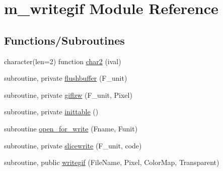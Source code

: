 \hypertarget{namespacem__writegif}{}\section{m\+\_\+writegif Module Reference}
\label{namespacem__writegif}
\subsection*{Functions/\+Subroutines}
\begin{DoxyCompactItemize}
\item 
character(len=2) function \mbox{\hyperlink{namespacem__writegif_a79ebbfd4c7df8520a82c75c3a62f0c96}{char2}} (ival)
\item 
subroutine, private \mbox{\hyperlink{namespacem__writegif_a48c5ca5487be9dbe565c0d4f8aa02d0d}{flushbuffer}} (F\+\_\+unit)
\item 
subroutine, private \mbox{\hyperlink{namespacem__writegif_a13c09be69495f4ba21ecb7c134216a17}{giflzw}} (F\+\_\+unit, Pixel)
\item 
subroutine, private \mbox{\hyperlink{namespacem__writegif_aed61b15f90188ddf39b71aa0c73a82a8}{inittable}} ()
\item 
subroutine \mbox{\hyperlink{namespacem__writegif_adb045213dd61508ad7dc7e5640fde67d}{open\+\_\+for\+\_\+write}} (Fname, Funit)
\item 
subroutine, private \mbox{\hyperlink{namespacem__writegif_a27e0ec2c6e05428641179bf35762adb7}{slicewrite}} (F\+\_\+unit, code)
\item 
subroutine, public \mbox{\hyperlink{namespacem__writegif_a02be37849028b2f9484cff1b4285375d}{writegif}} (File\+Name, Pixel, Color\+Map, Transparent)
\end{DoxyCompactItemize}

